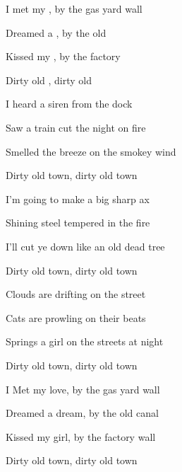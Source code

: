 \begin{SBVerse*}
I met my , by the gas yard wall

Dreamed a , by the old 

Kissed my , by the factory 

Dirty old , dirty old 
\end{SBVerse*}

\bigskip

I heard a siren from the dock

Saw a train cut the night on fire

Smelled the breeze on the smokey wind

Dirty old town, dirty old town

\bigskip

I'm going to make a big sharp ax

Shining steel tempered in the fire

I'll cut ye down like an old dead tree

Dirty old town, dirty old town

\bigskip

Clouds are drifting on the street

Cats are prowling on their beats

Springs a girl on the streets at night

Dirty old town, dirty old town

\bigskip

I Met my love, by the gas yard wall

Dreamed a dream, by the old canal

Kissed my girl, by the factory wall

Dirty old town, dirty old town
